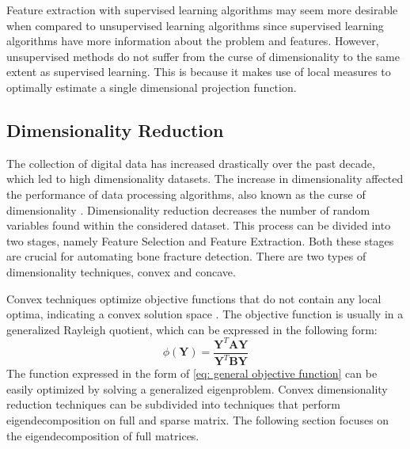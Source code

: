 \documentclass[11pt,twocolumn]{witseiepaper}
\begin{document}
	Feature extraction with supervised learning algorithms may seem more desirable when compared to unsupervised learning algorithms since supervised learning algorithms have more information about the problem and features. However, unsupervised methods do not suffer from the curse of dimensionality to the same extent as supervised learning. This is because it makes use of local measures to optimally estimate a single dimensional projection  function\cite{intrator_feature_1992}.
	
	\subsection{Dimensionality Reduction}
	The collection of digital data has increased drastically over the past decade, which led to high dimensionality datasets. The increase in dimensionality affected the performance of data processing algorithms, also known as the curse of dimensionality \cite{Center2002}. Dimensionality reduction decreases the number of random variables found within the considered dataset. This process can be divided into two stages, namely Feature Selection and Feature Extraction. Both these stages are crucial for automating bone fracture detection. There are two types of dimensionality techniques, convex and concave. 
	
	Convex techniques optimize objective functions that do not contain any local optima, indicating a convex solution space \cite{Boyd2010}. The objective function is usually in a generalized Rayleigh quotient, which can be expressed in the following form: 
	\begin{equation}
	\phi(\textbf{Y}) = \frac{\textbf{Y}^{T}\textbf{AY}}{\textbf{Y}^{T}\textbf{BY}}
	\label{eq: general objective function}
	\end{equation}
	The function expressed in the form of \eqref{eq: general objective function} can be easily optimized by solving a generalized eigenproblem. Convex dimensionality reduction techniques can be subdivided into techniques that perform eigendecomposition on full and sparse matrix. The following section focuses on the eigendecomposition of full matrices. 
	
\end{document}
